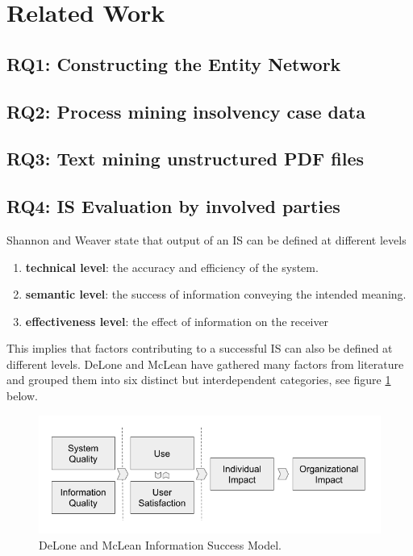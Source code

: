 \section{Related Work}

\subsection{RQ1: Constructing the Entity Network}
\subsection{RQ2: Process mining insolvency case data}
\subsection{RQ3: Text mining unstructured PDF files}
\subsection{RQ4: IS Evaluation by involved parties}
Shannon and Weaver \cite{shannon_weaver} state that output of an IS can be defined at different levels
\begin{enumerate}
\item \textbf{technical level}: the accuracy and efficiency of the system.
\item \textbf{semantic level}: the success of information conveying the intended meaning.
\item \textbf{effectiveness level}: the effect of information on the receiver 
\end{enumerate}

This implies that factors contributing to a successful IS can also be defined at different levels. DeLone and McLean\cite{delone_mclean:1, delone_mclean:2} have gathered many factors from literature and grouped them into six distinct but interdependent categories, see figure \ref{fig:success_model} below.

\begin{figure}[h]
\includegraphics[width=1\linewidth]{images/dm_is_success_model.png}
\caption{DeLone and McLean Information Success Model.}
\label{fig:success_model}
\end{figure}

